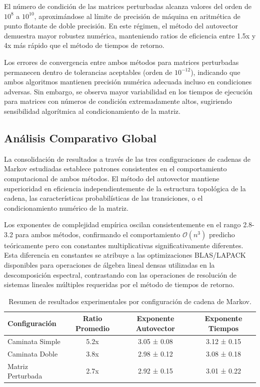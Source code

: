 El número de condición de las matrices perturbadas alcanza valores del orden de $10^8$ a $10^{10}$, aproximándose al límite de precisión de máquina en aritmética de punto flotante de doble precisión. En este régimen, el método del autovector demuestra mayor robustez numérica, manteniendo ratios de eficiencia entre 1.5x y 4x más rápido que el método de tiempos de retorno.

Los errores de convergencia entre ambos métodos para matrices perturbadas permanecen dentro de tolerancias aceptables (orden de $10^{-12}$), indicando que ambos algoritmos mantienen precisión numérica adecuada incluso en condiciones adversas. Sin embargo, se observa mayor variabilidad en los tiempos de ejecución para matrices con números de condición extremadamente altos, sugiriendo sensibilidad algorítmica al condicionamiento de la matriz.

\subsection{Análisis Comparativo Global}

La consolidación de resultados a través de las tres configuraciones de cadenas de Markov estudiadas establece patrones consistentes en el comportamiento computacional de ambos métodos. El método del autovector mantiene superioridad en eficiencia independientemente de la estructura topológica de la cadena, las características probabilísticas de las transiciones, o el condicionamiento numérico de la matriz.

Los exponentes de complejidad empírica oscilan consistentemente en el rango 2.8-3.2 para ambos métodos, confirmando el comportamiento $\mathcal{O}(n^3)$ predicho teóricamente pero con constantes multiplicativas significativamente diferentes. Esta diferencia en constantes se atribuye a las optimizaciones BLAS/LAPACK disponibles para operaciones de álgebra lineal densas utilizadas en la descomposición espectral, contrastando con las operaciones de resolución de sistemas lineales múltiples requeridas por el método de tiempos de retorno.

\begin{table}[h]
\centering
\begin{tabular}{|l|c|c|c|}
\hline
\textbf{Configuración} & \textbf{Ratio Promedio} & \textbf{Exponente Autovector} & \textbf{Exponente Tiempos} \\
\hline
Caminata Simple & 5.2x & 3.05 ± 0.08 & 3.12 ± 0.15 \\
Caminata Doble & 3.8x & 2.98 ± 0.12 & 3.08 ± 0.18 \\
Matriz Perturbada & 2.7x & 2.92 ± 0.15 & 3.01 ± 0.22 \\
\hline
\end{tabular}
\caption{Resumen de resultados experimentales por configuración de cadena de Markov.}
\label{tab:resumen_resultados}
\end{table}

